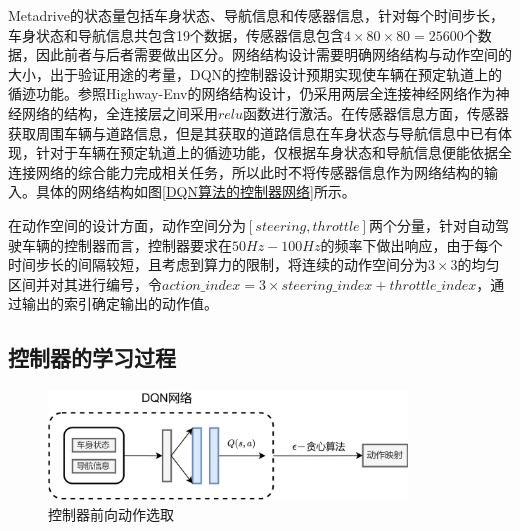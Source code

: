 Metadrive的状态量包括车身状态、导航信息和传感器信息，针对每个时间步长，车身状态和导航信息共包含19个数据，传感器信息包含$4\times80\times80=25600$个数据，因此前者与后者需要做出区分。网络结构设计需要明确网络结构与动作空间的大小，出于验证用途的考量，DQN的控制器设计预期实现使车辆在预定轨道上的循迹功能。参照Highway-Env的网络结构设计，仍采用两层全连接神经网络作为神经网络的结构，全连接层之间采用$relu$函数进行激活。在传感器信息方面，传感器获取周围车辆与道路信息，但是其获取的道路信息在车身状态与导航信息中已有体现，针对于车辆在预定轨道上的循迹功能，仅根据车身状态和导航信息便能依据全连接网络的综合能力完成相关任务，所以此时不将传感器信息作为网络结构的输入。具体的网络结构如图\ref{DQN算法的控制器网络}所示。

\begin{table}[htbp]
    \vspace{13pt} %
    \caption{控制器动作空间}\label{控制器动作空间}
    \centering
    \renewcommand\arraystretch{1.5}
\end{table}

在动作空间的设计方面，动作空间分为$[steering, throttle]$两个分量，针对自动驾驶车辆的控制器而言，控制器要求在$50Hz-100Hz$的频率下做出响应，由于每个时间步长的间隔较短，且考虑到算力的限制，将连续的动作空间分为$3 \times 3$的均匀区间并对其进行编号，令$action\_index = 3 \times steering\_index + throttle\_index$，通过输出的索引确定输出的动作值。

\subsection{控制器的学习过程}

\begin{figure}[htbp]
    \centering
    \includegraphics[width=0.85\textwidth]{images/chapter3/metadrive_forward.png}
    \caption{控制器前向动作选取}\label{控制器前向} %
\end{figure}  


